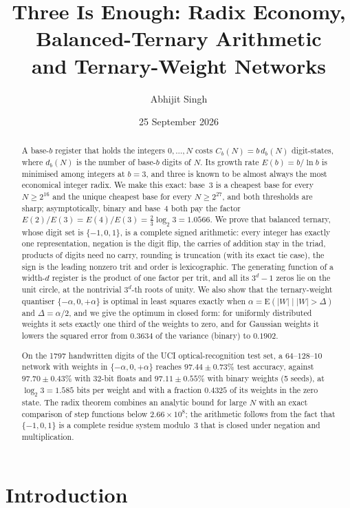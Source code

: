 \documentclass[11pt]{article}
\title{Three Is Enough: Radix Economy, Balanced-Ternary Arithmetic\\ and Ternary-Weight Networks}
\author{Abhijit Singh}
\date{25 September 2026}
\theoremstyle{definition}\newtheorem{definition}[theorem]{Definition}
\theoremstyle{remark}\newtheorem{remark}[theorem]{Remark}
\begin{document}
\maketitle

\begin{abstract}
\noindent A base-$b$ register that holds the integers $0,\dots,N$ costs $C_b(N)=b\,d_b(N)$ digit-states, where $d_b(N)$ is the number of base-$b$ digits of $N$. Its growth rate $E(b)=b/\ln b$ is minimised among integers at $b=3$, and three is known to be almost always the most economical integer radix. We make this exact: base~3 is a cheapest base for every $N\ge2^{16}$ and the unique cheapest base for every $N\ge2^{27}$, and both thresholds are sharp; asymptotically, binary and base~4 both pay the factor $E(2)/E(3)=E(4)/E(3)=\frac23\log_{2}3=1.0566$. We prove that balanced ternary, whose digit set is $\{-1,0,1\}$, is a complete signed arithmetic: every integer has exactly one representation, negation is the digit flip, the carries of addition stay in the triad, products of digits need no carry, rounding is truncation (with its exact tie case), the sign is the leading nonzero trit and order is lexicographic. The generating function of a width-$d$ register is the product of one factor per trit, and all its $3^d-1$ zeros lie on the unit circle, at the nontrivial $3^d$-th roots of unity. We also show that the ternary-weight quantiser $\{-\alpha,0,+\alpha\}$ is optimal in least squares exactly when $\alpha=\mathrm E(|W|\mid|W|>\Delta)$ and $\Delta=\alpha/2$, and we give the optimum in closed form: for uniformly distributed weights it sets exactly one third of the weights to zero, and for Gaussian weights it lowers the squared error from $0.3634$ of the variance (binary) to $0.1902$.

On the 1797 handwritten digits of the UCI optical-recognition test set, a $64$--$128$--$10$ network with weights in $\{-\alpha,0,+\alpha\}$ reaches $97.44\pm0.73\%$ test accuracy, against $97.70\pm0.43\%$ with 32-bit floats and $97.11\pm0.55\%$ with binary weights (5 seeds), at $\log_{2}3=1.585$ bits per weight and with a fraction $0.4325$ of its weights in the zero state. The radix theorem combines an analytic bound for large $N$ with an exact comparison of step functions below $2.66\times10^8$; the arithmetic follows from the fact that $\{-1,0,1\}$ is a complete residue system modulo~$3$ that is closed under negation and multiplication.
\end{abstract}

\section{Introduction}\label{sec:intro}
\end{document}
